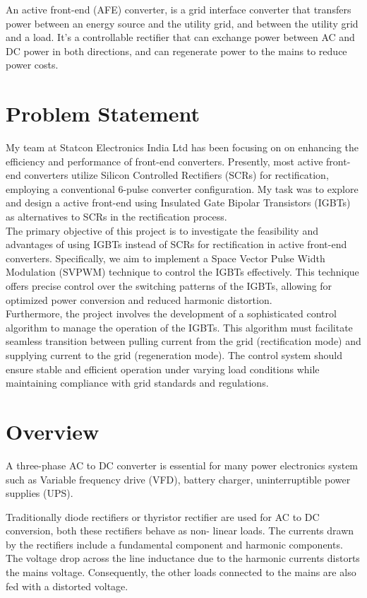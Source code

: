 An active front-end (AFE) converter, is a grid interface converter that
transfers power between an energy source and the utility grid, and between the
utility grid and a load. It's a controllable rectifier that can exchange power
between AC and DC power in both directions, and can regenerate power to the
mains to reduce power costs.
\section{Problem Statement}
My team at Statcon Electronics India Ltd has been focusing on on enhancing the
efficiency and performance of front-end converters. Presently, most active
front-end converters utilize Silicon Controlled Rectifiers (SCRs) for
rectification, employing a conventional 6-pulse converter configuration. My
task was to explore and design a active front-end using Insulated Gate Bipolar
Transistors (IGBTs) as alternatives to SCRs in the rectification process.\\

The primary objective of this project is to investigate the feasibility and
advantages of using IGBTs instead of SCRs for rectification in active front-end
converters. Specifically, we aim to implement a Space Vector Pulse Width
Modulation (SVPWM) technique to control the IGBTs effectively. This technique
offers precise control over the switching patterns of the IGBTs, allowing for
optimized power conversion and reduced harmonic distortion.\\

Furthermore, the project involves the development of a sophisticated control
algorithm to manage the operation of the IGBTs. This algorithm must facilitate
seamless transition between pulling current from the grid (rectification mode)
and supplying current to the grid (regeneration mode). The control system
should ensure stable and efficient operation under varying load conditions
while maintaining compliance with grid standards and regulations.

\section{Overview}
A three-phase AC to DC converter is essential for many power electronics system
such as Variable frequency drive (VFD), battery charger, uninterruptible power
supplies (UPS).

Traditionally diode rectifiers or thyristor rectifier are used for AC to DC
conversion, both these rectifiers behave as non- linear loads. The currents
drawn by the rectifiers include a fundamental component and harmonic
components. The voltage drop across the line inductance due to the harmonic
currents distorts the mains voltage. Consequently, the other loads connected to
the mains are also fed with a distorted voltage.

